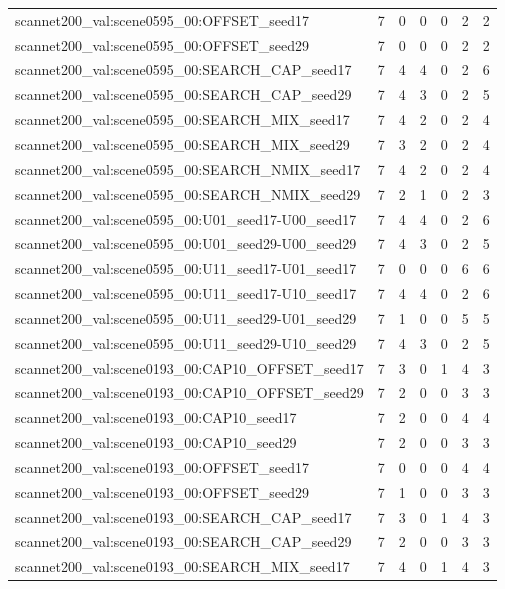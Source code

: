 \begin{table}[t]
\begin{tabular}{lrrrrrr}
scannet200\_val:scene0595\_00:OFFSET\_seed17 & 7 & 0 & 0 & 0 & 2 & 2 \\
scannet200\_val:scene0595\_00:OFFSET\_seed29 & 7 & 0 & 0 & 0 & 2 & 2 \\
scannet200\_val:scene0595\_00:SEARCH\_CAP\_seed17 & 7 & 4 & 4 & 0 & 2 & 6 \\
scannet200\_val:scene0595\_00:SEARCH\_CAP\_seed29 & 7 & 4 & 3 & 0 & 2 & 5 \\
scannet200\_val:scene0595\_00:SEARCH\_MIX\_seed17 & 7 & 4 & 2 & 0 & 2 & 4 \\
scannet200\_val:scene0595\_00:SEARCH\_MIX\_seed29 & 7 & 3 & 2 & 0 & 2 & 4 \\
scannet200\_val:scene0595\_00:SEARCH\_NMIX\_seed17 & 7 & 4 & 2 & 0 & 2 & 4 \\
scannet200\_val:scene0595\_00:SEARCH\_NMIX\_seed29 & 7 & 2 & 1 & 0 & 2 & 3 \\
scannet200\_val:scene0595\_00:U01\_seed17-U00\_seed17 & 7 & 4 & 4 & 0 & 2 & 6 \\
scannet200\_val:scene0595\_00:U01\_seed29-U00\_seed29 & 7 & 4 & 3 & 0 & 2 & 5 \\
scannet200\_val:scene0595\_00:U11\_seed17-U01\_seed17 & 7 & 0 & 0 & 0 & 6 & 6 \\
scannet200\_val:scene0595\_00:U11\_seed17-U10\_seed17 & 7 & 4 & 4 & 0 & 2 & 6 \\
scannet200\_val:scene0595\_00:U11\_seed29-U01\_seed29 & 7 & 1 & 0 & 0 & 5 & 5 \\
scannet200\_val:scene0595\_00:U11\_seed29-U10\_seed29 & 7 & 4 & 3 & 0 & 2 & 5 \\
scannet200\_val:scene0193\_00:CAP10\_OFFSET\_seed17 & 7 & 3 & 0 & 1 & 4 & 3 \\
scannet200\_val:scene0193\_00:CAP10\_OFFSET\_seed29 & 7 & 2 & 0 & 0 & 3 & 3 \\
scannet200\_val:scene0193\_00:CAP10\_seed17 & 7 & 2 & 0 & 0 & 4 & 4 \\
scannet200\_val:scene0193\_00:CAP10\_seed29 & 7 & 2 & 0 & 0 & 3 & 3 \\
scannet200\_val:scene0193\_00:OFFSET\_seed17 & 7 & 0 & 0 & 0 & 4 & 4 \\
scannet200\_val:scene0193\_00:OFFSET\_seed29 & 7 & 1 & 0 & 0 & 3 & 3 \\
scannet200\_val:scene0193\_00:SEARCH\_CAP\_seed17 & 7 & 3 & 0 & 1 & 4 & 3 \\
scannet200\_val:scene0193\_00:SEARCH\_CAP\_seed29 & 7 & 2 & 0 & 0 & 3 & 3 \\
scannet200\_val:scene0193\_00:SEARCH\_MIX\_seed17 & 7 & 4 & 0 & 1 & 4 & 3 \\

\end{tabular}
\end{table}
